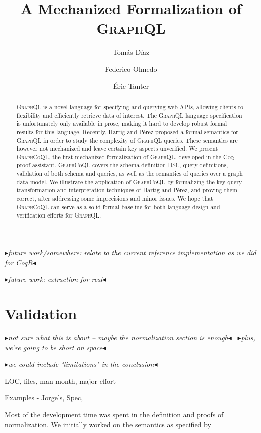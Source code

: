 \documentclass[sigplan,10pt,anonymous,review,nonacm]{acmart}
\newcommand{\mynote}[3]
    {{\color{#3} \fbox{\bfseries\sffamily\scriptsize#1}
    {\small$\blacktriangleright$\textsf{\emph{#2}}$\blacktriangleleft$}}~}
\newcommand{\et}[1]{\mynote{ET}{#1}{purple}}
\newcommand{\plstyle}[1]{\mbox{\textsc{#1}}\xspace}
\newcommand{\gql}{\plstyle{GraphQL}}
\newcommand{\gcoql}{\plstyle{GraphCoQL}}
\newcommand{\coq}{\plstyle{Coq}}
\begin{document}
\title{A Mechanized Formalization of \gql}
\author{Tomás Díaz}

\author{Federico Olmedo}
\author{Éric Tanter}

\begin{abstract}
\gql is a novel language for specifying and querying web APIs, allowing clients to flexibility and efficiently retrieve data of interest. The \gql language specification is unfortunately only available in prose, making it hard to develop robust formal results for this language. Recently, Hartig and Pérez proposed a formal semantics for \gql in order to study the complexity of \gql queries. These semantics are however not mechanized and leave certain key aspects unverified. We present \gcoql, the first mechanized formalization of \gql, developed in the \coq proof assistant.  \gcoql covers the schema definition DSL, query definitions, validation of both schema and queries, as well as the semantics of queries over a graph data model.
We illustrate the application of \gcoql by formalizing the key query transformation and interpretation techniques of Hartig and Pérez, and proving them correct, after addressing some imprecisions and minor issues. 
We hope that \gcoql can serve as a solid formal baseline for both language design and verification efforts for \gql.
\end{abstract}


\maketitle


\et{future work/somewhere: relate to the current reference implementation as we did for CoqR}

\et{future work: extraction for real}








\section{Validation}\label{sec:valid}
\et{not sure what this is about -- maybe the normalization section is enough}
\et{plus, we're going to be short on space}

\et{we could include "limitations" in the conclusion}

LOC, files, man-month, major effort

Examples - Jorge's, Spec,

Most of the development time was spent in the definition and proofs of normalization.
We initially worked on the semantics as specified by \cite{gqlph}






\end{document}

